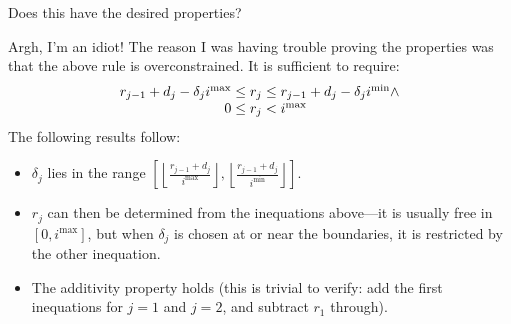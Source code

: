 \documentclass{article}
\newcommand{\n}{^{\mathrm{min}}}
\newcommand{\x}{^{\mathrm{max}}}
\begin{document}
Does this have the desired properties?

Argh, I'm an idiot!  The reason I was having trouble proving the
properties was that the above rule is overconstrained.  It is
sufficient to require:
\[
\begin{array}{r@{}c@{}l}
r_{j-1}+d_j-\delta_j i\x &{}\leq r_j \leq {}&r_{j-1}+d_j-\delta_j i\n \wedge\\
0 &{}\leq r_j <{}& i\x
\end{array}
\]
The following results follow:
\begin{itemize}
\item $\delta_j$ lies in the range $[\left\lfloor
\frac{r_{j-1}+d_j}{i\x} \right\rfloor,\left\lfloor
\frac{r_{j-1}+d_j}{i\n} \right\rfloor]$.
\item $r_j$ can then be determined
from the inequations above---it is usually free in $[0,i\x]$, but when
$\delta_j$ is chosen at or near the boundaries, it is restricted by
the other inequation.
\item The additivity property holds (this is trivial to verify: add
the first inequations for $j=1$ and $j=2$, and subtract $r_1$
through).
\end{itemize}
\end{document}
